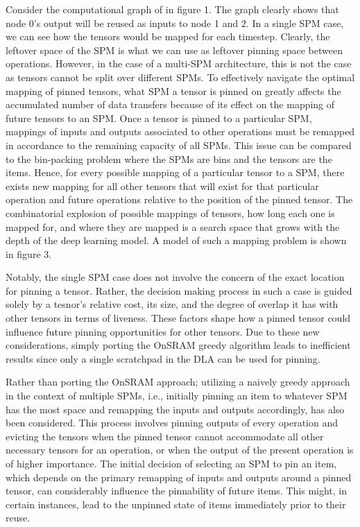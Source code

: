 Consider the computational graph of in figure 1. The graph clearly shows that
node 0's output will be reused as inputs to node 1 and 2. In a single SPM case,
we can see how the tensors would be mapped for each timestep. Clearly, the
leftover space of the SPM is what we can use as leftover pinning space between
operations. However, in the case of a multi-SPM architecture, this is not the
case as tensors cannot be split over different SPMs. To effectively navigate
the optimal mapping of pinned tensors, what SPM a tensor is pinned on greatly
affects the accumulated number of data transfers because of its effect on the
mapping of future tensors to an SPM. Once a tensor is pinned to a particular
SPM, mappings of inputs and outputs associated to other operations must be
remapped in accordance to the remaining capacity of all SPMs. This issue can be
compared to the bin-packing problem where the SPMs are bins and the tensors are
the items. Hence, for every possible mapping of a particular tensor to a SPM,
there exists new mapping for all other tensors that will exist for that
particular operation and future operations relative to the position of the
pinned tensor. The combinatorial explosion of possible mappings of tensors,
how long each one is mapped for, and where they are mapped is a search space
that grows with the depth of the deep learning model. A model of such
a mapping problem is shown in figure 3.

Notably, the single SPM case does not involve the concern of the exact location for
pinning a tensor. Rather, the decision making process in such a case is guided
solely by a tesnor's relative cost, its size, and the degree of overlap it has
with other tensors in terms of liveness. These factors shape how a pinned
tensor could influence future pinning opportunities for other tensors.
Due to these new considerations, simply porting the OnSRAM greedy algorithm 
leads to inefficient results since only a single scratchpad in the DLA can
be used for pinning.

Rather than porting the OnSRAM approach; utilizing a naively greedy approach in
the context of multiple SPMs, i.e., initially pinning an item to whatever SPM
has the most space and remapping the inputs and outputs accordingly, has also
been considered. This process involves pinning outputs of every operation and
evicting the tensors when the pinned tensor cannot accommodate all other
necessary tensors for an operation, or when the output of the present operation
is of higher importance. The initial decision of selecting an SPM to pin an
item, which depends on the primary remapping of inputs and outputs around a
pinned tensor, can considerably influence the pinnability of future items. This
might, in certain instances, lead to the unpinned state of items immediately
prior to their reuse.

